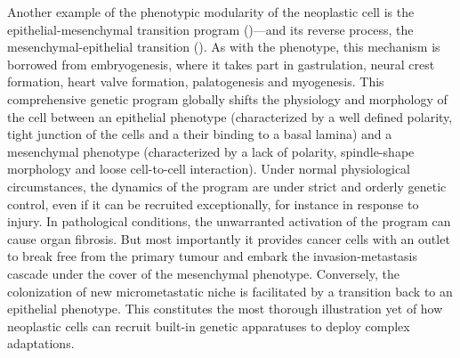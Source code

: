 
Another example of the phenotypic modularity of the neoplastic cell is the
epithelial-mesenchymal transition program ()---and its reverse
process, the mesenchymal-epithelial transition ().  As with the
 phenotype, this mechanism is borrowed from embryogenesis, where
it takes part in gastrulation, neural crest formation, heart valve formation,
palatogenesis and myogenesis.\cite{thiery_epithelial-mesenchymal_2009} This
comprehensive genetic program globally shifts the physiology and morphology of
the cell between an epithelial phenotype (characterized by a well defined
polarity, tight junction of the cells and a their binding to a basal lamina) and
a mesenchymal phenotype (characterized by a lack of polarity, spindle-shape
morphology and loose cell-to-cell interaction).\cite{thiery_complex_2006} Under
normal physiological circumstances, the dynamics of the 
program are under strict and orderly genetic control, even if it can be
recruited exceptionally, for instance in response to injury.  In pathological
conditions, the unwarranted activation of the  program can
cause organ fibrosis.  But most importantly it provides cancer cells with an
outlet to break free from the primary tumour and embark the invasion-metastasis
cascade under the cover of the mesenchymal phenotype.  Conversely, the
colonization of new micrometastatic niche is facilitated by a transition back to
an epithelial phenotype.  This constitutes the most thorough illustration yet of
how neoplastic cells can recruit built-in genetic apparatuses to deploy complex
adaptations.


